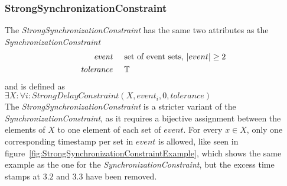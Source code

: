 	\subsubsection{StrongSynchronizationConstraint}
		The \emph{StrongSynchronizationConstraint} has the same two attributes as the \emph{SynchronizationConstraint}
		\begin{align*}
			\emph{event} & \hspace{.5cm}\text{set of event sets, $|event|\geq 2$}\\
			\emph{tolerance} & \hspace{.5cm}\mathbb{T}
		\end{align*}
		and is defined as\\[10pt]
		\begin{math}
			\exists X: \forall i: StrongDelayConstraint(X, event_i, 0, tolerance)
		\end{math}\\[10pt]
		The \emph{StrongSynchronizationConstraint} is a stricter variant of the \emph{SynchronizationConstraint}, as it requires a bijective assignment between the elements of $X$ to one element of each set of $event$. For every $x\in X$, only one corresponding timestamp per set in $event$ is allowed, like seen in figure~\ref{fig:StrongSynchronizationConstraintExample}, which shows the same example as the one for the \emph{SynchronizationConstraint}, but the excess time stamps at $3.2$ and $3.3$ have been removed.
